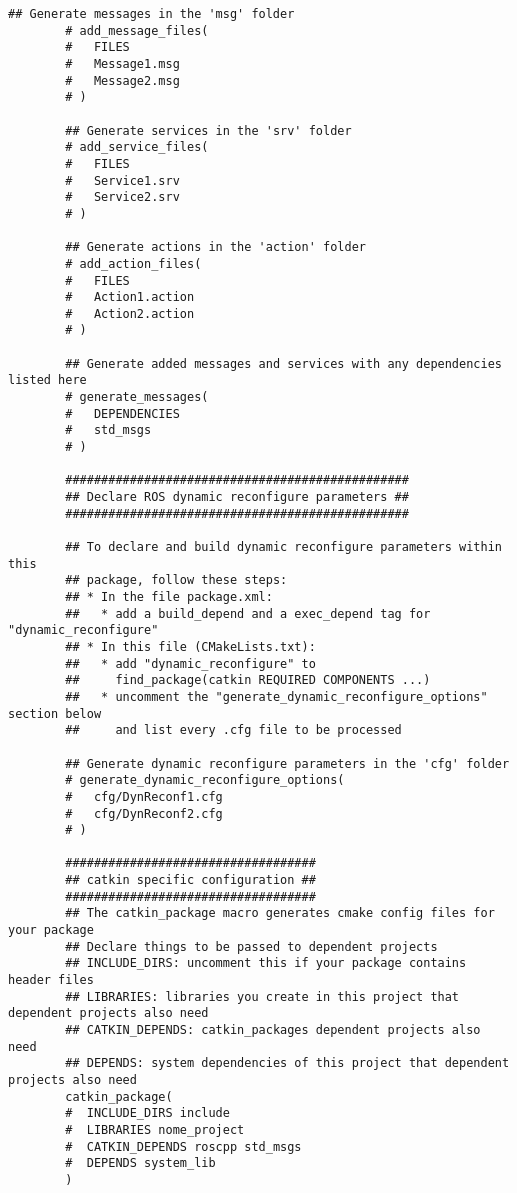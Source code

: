 \documentclass[letterpaper]{article}
\begin{document}
\begin{itemize}
\begin{lstlisting}[style=mystyle, title=src/nome\_project/CMakeLists.txt]
        ## Generate messages in the 'msg' folder
        # add_message_files(
        #   FILES
        #   Message1.msg
        #   Message2.msg
        # )
        
        ## Generate services in the 'srv' folder
        # add_service_files(
        #   FILES
        #   Service1.srv
        #   Service2.srv
        # )
        
        ## Generate actions in the 'action' folder
        # add_action_files(
        #   FILES
        #   Action1.action
        #   Action2.action
        # )
        
        ## Generate added messages and services with any dependencies listed here
        # generate_messages(
        #   DEPENDENCIES
        #   std_msgs
        # )
        
        ################################################
        ## Declare ROS dynamic reconfigure parameters ##
        ################################################
        
        ## To declare and build dynamic reconfigure parameters within this
        ## package, follow these steps:
        ## * In the file package.xml:
        ##   * add a build_depend and a exec_depend tag for "dynamic_reconfigure"
        ## * In this file (CMakeLists.txt):
        ##   * add "dynamic_reconfigure" to
        ##     find_package(catkin REQUIRED COMPONENTS ...)
        ##   * uncomment the "generate_dynamic_reconfigure_options" section below
        ##     and list every .cfg file to be processed
        
        ## Generate dynamic reconfigure parameters in the 'cfg' folder
        # generate_dynamic_reconfigure_options(
        #   cfg/DynReconf1.cfg
        #   cfg/DynReconf2.cfg
        # )
        
        ###################################
        ## catkin specific configuration ##
        ###################################
        ## The catkin_package macro generates cmake config files for your package
        ## Declare things to be passed to dependent projects
        ## INCLUDE_DIRS: uncomment this if your package contains header files
        ## LIBRARIES: libraries you create in this project that dependent projects also need
        ## CATKIN_DEPENDS: catkin_packages dependent projects also need
        ## DEPENDS: system dependencies of this project that dependent projects also need
        catkin_package(
        #  INCLUDE_DIRS include
        #  LIBRARIES nome_project
        #  CATKIN_DEPENDS roscpp std_msgs
        #  DEPENDS system_lib
        )
        

\end{lstlisting}
\end{itemize}
\end{document}
